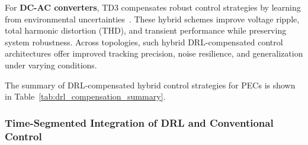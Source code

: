 For \textbf{DC-AC converters}, TD3 compensates robust control strategies by learning from environmental uncertainties~\cite{nicola2022improved,wang2023improved,nicola2022comparative}. These hybrid schemes improve voltage ripple, total harmonic distortion (THD), and transient performance while preserving system robustness. Across topologies, such hybrid DRL-compensated control architectures offer improved tracking precision, noise resilience, and generalization under varying conditions.


The summary of DRL-compensated hybrid control strategies for PECs is shown in Table~\ref{tab:drl_compensation_summary}.


\subsubsection{Time-Segmented Integration of DRL and Conventional Control}
